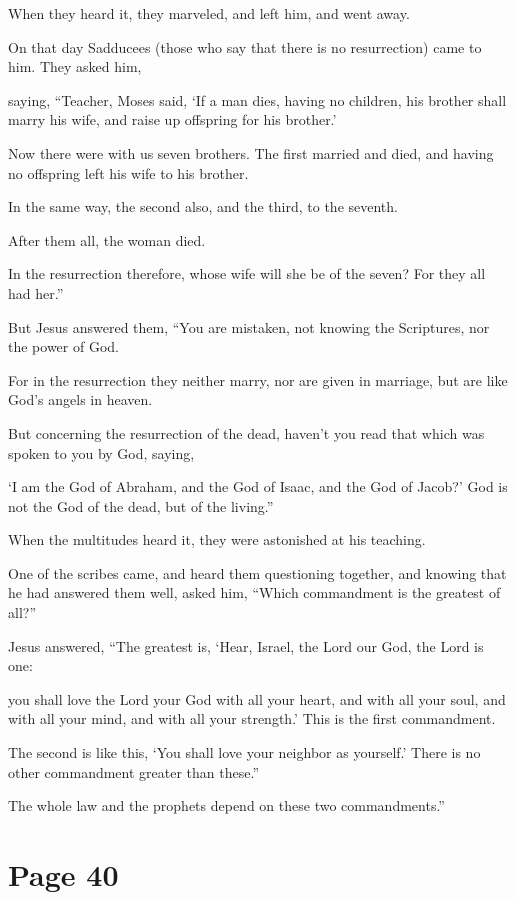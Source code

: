 When they heard it, they marveled, and left him, and went away.

On that day Sadducees (those who say that there is no resurrection) came to him. They asked him,

saying, “Teacher, Moses said, ‘If a man dies, having no children, his brother shall marry his wife, and raise up offspring for his brother.’

Now there were with us seven brothers. The first married and died, and having no offspring left his wife to his brother.

In the same way, the second also, and the third, to the seventh.

After them all, the woman died.

In the resurrection therefore, whose wife will she be of the seven? For they all had her.”

But Jesus answered them, “You are mistaken, not knowing the Scriptures, nor the power of God.

For in the resurrection they neither marry, nor are given in marriage, but are like God’s angels in heaven.

But concerning the resurrection of the dead, haven’t you read that which was spoken to you by God, saying,

‘I am the God of Abraham, and the God of Isaac, and the God of Jacob?’ God is not the God of the dead, but of the living.”

When the multitudes heard it, they were astonished at his teaching.

One of the scribes came, and heard them questioning together, and knowing that he had answered them well, asked him, “Which commandment is the greatest of all?”

Jesus answered, “The greatest is, ‘Hear, Israel, the Lord our God, the Lord is one:

you shall love the Lord your God with all your heart, and with all your soul, and with all your mind, and with all your strength.’ This is the first commandment.

The second is like this, ‘You shall love your neighbor as yourself.’ There is no other commandment greater than these.”

The whole law and the prophets depend on these two commandments.”



\chapterornament
\section*{Page 40}


